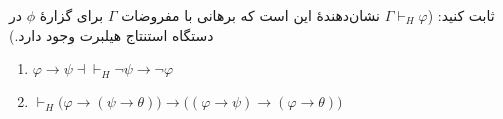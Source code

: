 ثابت کنید: ($\Gamma \vdash_H \varphi$ نشان‌دهندهٔ این است که برهانی با مفروضات $\Gamma$ برای گزارهٔ $\phi$ در دستگاه استنتاج هیلبرت وجود دارد.)
\begin{enumerate}[label=(\alph*)]
  \item $\varphi \rightarrow \psi \dashv\vdash_H \neg\psi \rightarrow \neg\varphi$
  \item $\vdash_H \big(\varphi \rightarrow (\psi \rightarrow \theta)\big) \rightarrow \big((\varphi \rightarrow \psi) \rightarrow (\varphi \rightarrow \theta)\big)$
\end{enumerate}